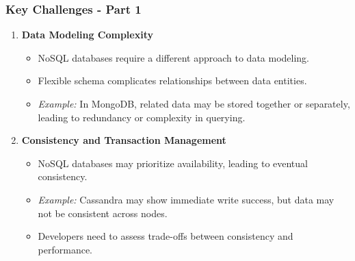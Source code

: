 \documentclass[aspectratio=169]{beamer}
\begin{document}
\begin{frame}[fragile]
    \frametitle{Key Challenges - Part 1}
    \begin{enumerate}
        \item \textbf{Data Modeling Complexity}
        \begin{itemize}
            \item NoSQL databases require a different approach to data modeling.
            \item Flexible schema complicates relationships between data entities.
            \item \textit{Example:} In MongoDB, related data may be stored together or separately, leading to redundancy or complexity in querying.
        \end{itemize}
        
        \item \textbf{Consistency and Transaction Management}
        \begin{itemize}
            \item NoSQL databases may prioritize availability, leading to eventual consistency.
            \item \textit{Example:} Cassandra may show immediate write success, but data may not be consistent across nodes.
            \item Developers need to assess trade-offs between consistency and performance.
        \end{itemize}
    \end{enumerate}
\end{frame}
\end{document}
